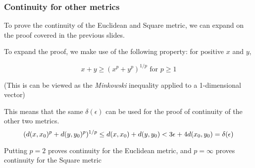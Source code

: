 \begin{frame}
    \frametitle{Continuity for other metrics}

    To prove the continuity of the Euclidean and Square metric, we can expand on the proof covered in the previous slides.

    \pause
    To expand the proof, we make use of the following property:
    for positive \(x\) and \(y\),
     
    \begin{equation}
        x+y \geq (x^p+y^p)^{1/p} \text{ for } p \geq 1
    \end{equation}
    
    (This is can be viewed as the \textit{Minkowski} inequality applied to a 1-dimensional vector)

    \pause

    This means that the same \(\delta(\epsilon)\) can be used for the proof of continuity of the other two metrics.
    \begin{equation}
        (d(x, x_0)^p + d(y, y_0)^p)^{1/p} \leq d(x, x_0) + d(y, y_0) < 3\epsilon + 4d(x_0, y_0) = \delta(\epsilon)
    \end{equation}

    Putting \(p = 2\) proves continuity for the Euclidean metric, and \(p=\infty\) proves continuity for the Square metric
    
\end{frame}

